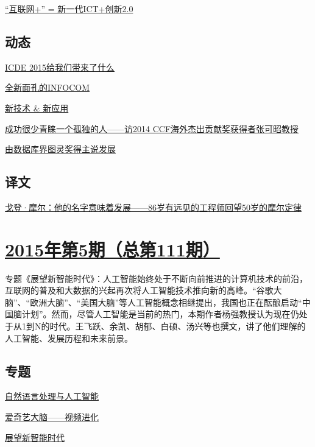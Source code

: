 \documentclass[a4paper]{article}
\begin{document}
\href{http://history.ccf.org.cn/resources/1190201776262/2015/06/12/9.pdf}{“互联网+” = 新一代ICT+创新2.0}

\subsection{动态}
\href{http://history.ccf.org.cn/resources/1190201776262/2015/06/12/13.pdf}{ICDE 2015给我们带来了什么}

\href{http://history.ccf.org.cn/resources/1190201776262/2015/06/12/14.pdf}{全新面孔的INFOCOM}

\href{http://history.ccf.org.cn/resources/1190201776262/2015/06/12/15.pdf}{新技术 \& 新应用}

\href{http://history.ccf.org.cn/resources/1190201776262/2015/06/12/11.pdf}{成功很少青睐一个孤独的人——访2014 CCF海外杰出贡献奖获得者张可昭教授}

\href{http://history.ccf.org.cn/resources/1190201776262/2015/06/12/12.pdf}{由数据库界图灵奖得主说发展}

\subsection{译文}
\href{http://history.ccf.org.cn/resources/1190201776262/2015/06/12/16.pdf}{戈登·摩尔：他的名字意味着发展——86岁有远见的工程师回望50岁的摩尔定律}


\section{\href{http://history.ccf.org.cn/sites/ccf/jsjtbbd.jsp?contentId=2860516747201}{\textbf{2015年第5期（总第111期）}}}
专题《展望新智能时代》：人工智能始终处于不断向前推进的计算机技术的前沿，互联网的普及和大数据的兴起再次将人工智能技术推向新的高峰。“谷歌大脑”、“欧洲大脑”、“美国大脑”等人工智能概念相继提出，我国也正在酝酿启动“中国脑计划”。然而，尽管人工智能是当前的热门，本期作者杨强教授认为现在仍处于从1到N的时代。王飞跃、余凯、胡郁、白硕、汤兴等也撰文，讲了他们理解的人工智能、发展历程和未来前景。
\subsection{专题}
\href{http://history.ccf.org.cn/resources/1190201776262/2015/05/12/6.pdf}{自然语言处理与人工智能}

\href{http://history.ccf.org.cn/resources/1190201776262/2015/05/12/7.pdf}{爱奇艺大脑——视频进化}

\href{http://history.ccf.org.cn/resources/1190201776262/2015/05/12/1.pdf}{展望新智能时代}
\end{document}
